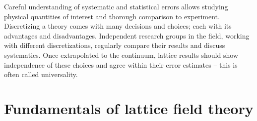 Careful understanding of systematic and statistical errors allows studying physical quantities of interest and thorough comparison to experiment.
Discretizing a theory comes with many decisions and choices; each with its advantages and disadvantages.
Independent research groups in the field, working with different discretizations, regularly compare their results and discuss systematics.
Once extrapolated to the continuum, lattice results should show independence of these choices and agree within their error estimates -- this is often called universality.

\section{Fundamentals of lattice field theory}

